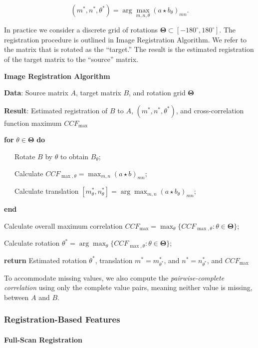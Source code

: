 \documentclass[11pt,]{isuthesis}
\let\oldparagraph\paragraph
\renewcommand{\paragraph}[1]{\oldparagraph{#1}\mbox{}}
\begin{document}
\[
(m^*,n^*,\theta^*) = \arg \max_{m,n,\theta} (a \star b_\theta)_{mn}.
\]

In practice we consider a discrete grid of rotations \(\pmb{\Theta} \subset [-180^\circ,180^\circ]\).
The registration procedure is outlined in Image Registration Algorithm.
We refer to the matrix that is rotated as the ``target.''
The result is the estimated registration of the target matrix to the ``source'' matrix.

\textbf{Image Registration Algorithm}

\textbf{Data}: Source matrix \(A\), target matrix \(B\), and rotation grid \(\pmb{\Theta}\)

\textbf{Result}: Estimated registration of \(B\) to \(A\), \((m^*, n^*, \theta^*)\), and cross-correlation function maximum \(CCF_{\max}\)

\textbf{for} \(\theta \in \pmb{\Theta}\) \textbf{do}

~~~Rotate \(B\) by \(\theta\) to obtain \(B_\theta\);

~~~Calculate \(CCF_{\max,\theta} = \max_{m,n} (a \star b)_{mn}\);

~~~Calculate translation \([m_{\theta}^*, n_{\theta}^*] = \arg \max_{m,n} (a \star b_\theta)_{mn}\);

\textbf{end}

Calculate overall maximum correlation \(CCF_{\max} = \max_{\theta} \{CCF_{\max, \theta} : \theta \in \pmb{\Theta}\}\);

Calculate rotation \(\theta^* = \arg \max_{\theta} \{CCF_{\max,\theta} : \theta \in \pmb{\Theta}\}\);

\textbf{return} Estimated rotation \(\theta^*\), translation \(m^* = m_{\theta^*}^*\), and \(n^* = n_{\theta^*}^*\), and \(CCF_{\max}\)

To accommodate missing values, we also compute the \emph{pairwise-complete correlation} using only the complete value pairs, meaning neither value is missing, between \(A\) and \(B\).

\hypertarget{registration-based-features}{%
\subsubsection{Registration-Based Features}\label{registration-based-features}}

\hypertarget{full-scan-registration}{%
\paragraph{Full-Scan Registration}\label{full-scan-registration}}
\end{document}
